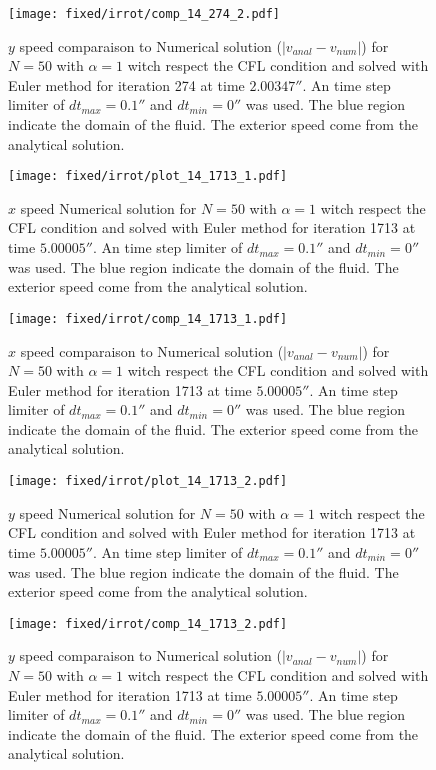 \begin{figure}
\texttt{[image: fixed/irrot/comp\_14\_274\_2.pdf]}
\caption{$y$ speed comparaison to Numerical solution ($|v_{anal}-v_{num}|$) for $N=50$ with $\alpha=1$ witch respect the CFL condition and solved with Euler method
for iteration 274 at time $\unit{2.00347}{\second}$.
An time step limiter of $dt_{max}=\unit{0.1}{\second}$ and $dt_{min}=\unit{0}{\second}$ was used.
The blue region indicate the domain of the fluid. The exterior speed come from the analytical solution.
\label{fix:comp_14_274_2}
}
\end{figure}

\begin{figure}
\texttt{[image: fixed/irrot/plot\_14\_1713\_1.pdf]}
\caption{$x$ speed Numerical solution for $N=50$ with $\alpha=1$ witch respect the CFL condition and solved with Euler method
for iteration 1713 at time $\unit{5.00005}{\second}$.
An time step limiter of $dt_{max}=\unit{0.1}{\second}$ and $dt_{min}=\unit{0}{\second}$ was used.
The blue region indicate the domain of the fluid. The exterior speed come from the analytical solution.
\label{fix:plot_14_1713_1}
}
\end{figure}

\begin{figure}
\texttt{[image: fixed/irrot/comp\_14\_1713\_1.pdf]}
\caption{$x$ speed comparaison to Numerical solution ($|v_{anal}-v_{num}|$) for $N=50$ with $\alpha=1$ witch respect the CFL condition and solved with Euler method
for iteration 1713 at time $\unit{5.00005}{\second}$.
An time step limiter of $dt_{max}=\unit{0.1}{\second}$ and $dt_{min}=\unit{0}{\second}$ was used.
The blue region indicate the domain of the fluid. The exterior speed come from the analytical solution.
\label{fix:comp_14_1713_1}
}
\end{figure}

\begin{figure}
\texttt{[image: fixed/irrot/plot\_14\_1713\_2.pdf]}
\caption{$y$ speed Numerical solution for $N=50$ with $\alpha=1$ witch respect the CFL condition and solved with Euler method
for iteration 1713 at time $\unit{5.00005}{\second}$.
An time step limiter of $dt_{max}=\unit{0.1}{\second}$ and $dt_{min}=\unit{0}{\second}$ was used.
The blue region indicate the domain of the fluid. The exterior speed come from the analytical solution.
\label{fix:plot_14_1713_2}
}
\end{figure}

\begin{figure}
\texttt{[image: fixed/irrot/comp\_14\_1713\_2.pdf]}
\caption{$y$ speed comparaison to Numerical solution ($|v_{anal}-v_{num}|$) for $N=50$ with $\alpha=1$ witch respect the CFL condition and solved with Euler method
for iteration 1713 at time $\unit{5.00005}{\second}$.
An time step limiter of $dt_{max}=\unit{0.1}{\second}$ and $dt_{min}=\unit{0}{\second}$ was used.
The blue region indicate the domain of the fluid. The exterior speed come from the analytical solution.
\label{fix:comp_14_1713_2}
}
\end{figure}

